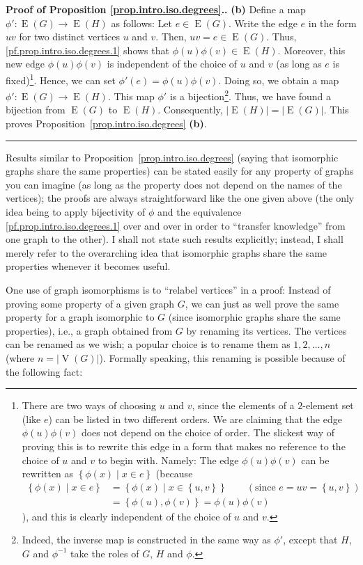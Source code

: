 \documentclass[numbers=enddot,12pt,final,onecolumn,notitlepage]{scrartcl}%
\theoremstyle{definition}
\newenvironment{proof}[1][Proof]{\noindent\textbf{#1.} }{\ \rule{0.5em}{0.5em}}
\newcommand{\set}[1]{\left\{ #1 \right\}}
\newcommand{\abs}[1]{\left| #1 \right|}
\newcommand{\tup}[1]{\left( #1 \right)}
\newcommand{\verts}[1]{\operatorname{V}\left( #1 \right)}
\newcommand{\edges}[1]{\operatorname{E}\left( #1 \right)}
\begin{document}
\begin{proof}[Proof of Proposition \ref{prop.intro.iso.degrees}.]
\textbf{(b)}
Define a map $\phi' : \edges{G} \to \edges{H}$ as follows:
Let $e \in \edges{G}$. Write the edge $e$ in the form $uv$ for two
distinct vertices $u$ and $v$. Then, $uv = e \in \edges{G}$. Thus,
\eqref{pf.prop.intro.iso.degrees.1} shows that
$\phi\tup{u}\phi\tup{v} \in \edges{H}$. Moreover, this new edge
$\phi\tup{u}\phi\tup{v}$ is independent of the choice of $u$ and $v$
(as long as $e$ is fixed)\footnote{There are two ways of choosing $u$
and $v$, since the elements of a $2$-element set (like $e$) can be
listed in two different orders. We are claiming that the edge
$\phi\tup{u}\phi\tup{v}$ does not depend on the choice of order. The
slickest way of proving this is to rewrite this edge in a form that
makes no reference to the choice of $u$ and $v$ to begin with.
Namely: The edge $\phi\tup{u}\phi\tup{v}$ can be rewritten as
$\set{\phi\tup{x} \mid x \in e}$ (because
\begin{align*}
\set{\phi\tup{x} \mid x \in e}
&= \set{\phi\tup{x} \mid x \in \set{u,v}}
\qquad \left(\text{since } e = uv = \set{u,v}\right) \\
&= \set{\phi\tup{u},\phi\tup{v}} = \phi\tup{u}\phi\tup{v}
\end{align*}
), and this is clearly independent of the choice of $u$ and $v$.}.
Hence, we can set $\phi'\tup{e} = \phi\tup{u}\phi\tup{v}$. Doing so,
we obtain a map $\phi' : \edges{G} \to \edges{H}$. This map $\phi'$ is
a bijection\footnote{Indeed, the inverse map is constructed in the
same way as $\phi'$, except that $H$, $G$ and $\phi^{-1}$ take the
roles of $G$, $H$ and $\phi$.}. Thus, we have found a bijection from
$\edges{G}$ to $\edges{H}$. Consequently,
$\abs{\edges{H}} = \abs{\edges{G}}$.
This proves Proposition~\ref{prop.intro.iso.degrees} \textbf{(b)}.
\end{proof}

Results similar to Proposition~\ref{prop.intro.iso.degrees} (saying
that isomorphic graphs share the same properties) can be stated easily
for any property of graphs you can imagine (as long as the property
does not depend on the names of the vertices); the proofs are always
straightforward like the one given above (the only idea being to apply
bijectivity of $\phi$ and the equivalence
\eqref{pf.prop.intro.iso.degrees.1} over and over in order to
``transfer knowledge'' from one graph to the other). I shall not
state such results explicitly; instead, I shall merely refer to the
overarching idea that isomorphic graphs share the same properties
whenever it becomes useful.

One use of graph isomorphisms is to ``relabel vertices'' in a proof:
Instead of proving some property of a given graph $G$, we can just as
well prove the same property for a graph isomorphic to $G$ (since
isomorphic graphs share the same properties), i.e., a graph obtained
from $G$ by renaming its vertices. The vertices can be renamed as we
wish; a popular choice is to rename them as $1,2,\ldots,n$ (where
$n = \abs{\verts{G}}$). Formally speaking, this renaming is possible
because of the following fact:
\end{document}
